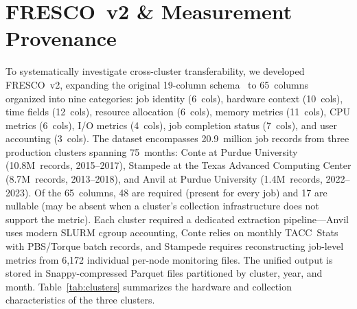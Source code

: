 \documentclass[sigconf]{acmart}
\begin{document}
\section{FRESCO~v2 \& Measurement Provenance}

To systematically investigate cross-cluster transferability, we developed FRESCO~v2, expanding the original 19-column schema~\cite{mckerracher2025fresco} to 65~columns organized into nine categories: job identity (6~cols), hardware context (10~cols), time fields (12~cols), resource allocation (6~cols), memory metrics (11~cols), CPU metrics (6~cols), I/O metrics (4~cols), job completion status (7~cols), and user accounting (3~cols).
The dataset encompasses 20.9~million job records from three production clusters spanning 75~months: Conte at Purdue University (10.8M~records, 2015--2017), Stampede at the Texas Advanced Computing Center (8.7M~records, 2013--2018), and Anvil at Purdue University (1.4M~records, 2022--2023).
Of the 65~columns, 48 are required (present for every job) and 17 are nullable (may be absent when a cluster's collection infrastructure does not support the metric).
Each cluster required a dedicated extraction pipeline---Anvil uses modern SLURM cgroup accounting, Conte relies on monthly TACC~Stats with PBS/Torque batch records, and Stampede requires reconstructing job-level metrics from 6,172 individual per-node monitoring files.
The unified output is stored in Snappy-compressed Parquet files partitioned by cluster, year, and month.
Table~\ref{tab:clusters} summarizes the hardware and collection characteristics of the three clusters.
\end{document}

